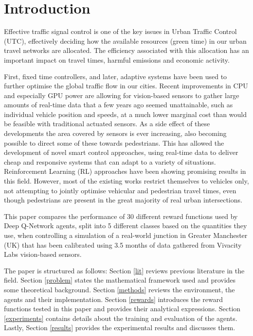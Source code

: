\documentclass[a4paper, conference]{IEEEtran}
\begin{document}
\IEEEpeerreviewmaketitle

\section{Introduction}
Effective traffic signal control is one of the key issues in Urban Traffic Control (UTC), effectively deciding how the available resources (green time) in our urban travel networks are allocated.
The efficiency associated with this allocation has an important impact on travel times, harmful emissions and economic activity.

First, fixed time controllers, and later, adaptive systems have been used to further optimise the global traffic flow in our cities.
Recent improvements in CPU and especially GPU power are allowing for vision-based sensors to gather large amounts of real-time data that a few years ago seemed unattainable, such as individual vehicle position and speeds, at a much lower marginal cost than would be feasible with traditional actuated sensors.
As a side effect of these developments the area covered by sensors is ever increasing, also becoming possible to direct some of these towards pedestrians.
This has allowed the development of novel smart control approaches, using real-time data to deliver cheap and responsive systems that can adapt to a variety of situations.
Reinforcement Learning (RL) approaches have been showing promising results in this field.
However, most of the existing works restrict themselves to vehicles only, not attempting to jointly optimise vehicular and pedestrian travel times, even though pedestrians are present in the great majority of real urban intersections.

This paper compares the performance of 30 different reward functions used by Deep Q-Network agents, split into 5 different classes based on the quantities they use, when controlling a simulation of a real-world junction in Greater Manchester (UK) that has been calibrated using 3.5 months of data gathered from Vivacity Labs vision-based sensors.

The paper is structured as follows:
Section \ref{lit} reviews previous literature in the field.
Section \ref{problem} states the mathematical framework used and provides some theoretical background.  
Section \ref{methods} reviews the environment, the agents and their implementation.
Section \ref{rewards} introduces the reward functions tested in this paper and provides their analytical expressions.
Section \ref{experiments} contains details about the training and evaluation of the agents.
Lastly, Section \ref{results} provides the experimental results and discusses them.
\end{document}
